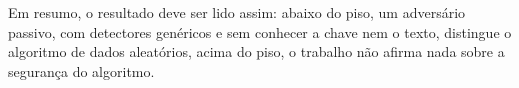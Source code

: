 Em resumo, o resultado deve ser lido assim: abaixo do piso, um adversário passivo, com detectores genéricos e sem conhecer a chave nem o texto, distingue o algoritmo de dados aleatórios, acima do piso, o trabalho não afirma nada sobre a segurança do algoritmo.



